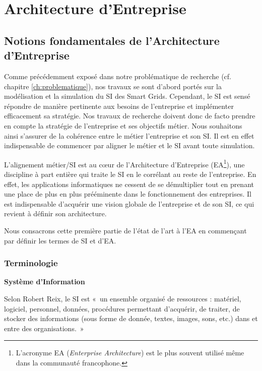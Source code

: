 \chapter{Architecture d'Entreprise}
\label{ch:EA}





\section{Notions fondamentales de l'Architecture d'Entreprise}

Comme précédemment exposé dans notre problématique de recherche (cf. chapitre \ref{ch:problematique}), nos travaux se sont d'abord portés sur la modélisation et la simulation du SI des Smart Grids. Cependant, le SI est sensé répondre de manière pertinente aux besoins de l'entreprise et implémenter efficacement sa stratégie. Nos travaux de recherche doivent donc de facto prendre en compte la stratégie de l'entreprise et ses objectifs métier. Nous souhaitons ainsi s'assurer de la cohérence entre le métier l'entreprise et son SI. Il est en effet indispensable de commencer par aligner le métier et le SI avant toute simulation. 

L'alignement métier/SI est au cœur de l'Architecture d'Entreprise (EA\footnote{L'acronyme EA (\textit{Enterprise Architecture}) est le plus souvent utilisé même dans la communauté francophone.}), une discipline à part entière qui traite le SI en le corrélant au reste de l'entreprise. En effet, les applications informatiques ne cessent de se démultiplier tout en prenant une place de plus en plus prééminente dans le fonctionnement des entreprises. Il est indispensable d'acquérir une vision globale de l'entreprise et de son SI, ce qui revient à définir son architecture.  

Nous consacrons cette première partie de l'état de l'art à l'EA en commençant par définir les termes de SI et d'EA. 
  
	\subsection{Terminologie}
	
\textbf{Système d'Information}


Selon Robert Reix, le SI est «~un ensemble organisé de ressources : matériel, 
logiciel, personnel, données, procédures permettant d'acquérir, de traiter, de 
stocker des informations (sous forme de donnée, textes, images, sons, etc.) dans 
et entre des organisations.~»

